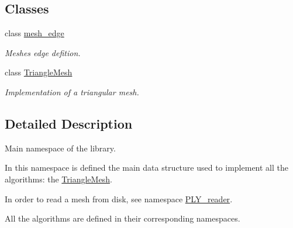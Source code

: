 \subsection*{Classes}
\begin{DoxyCompactItemize}
\item 
class \hyperlink{classgeoproc_1_1mesh__edge}{mesh\+\_\+edge}
\begin{DoxyCompactList}\small\item\em Meshe\textquotesingle{}s edge defition. \end{DoxyCompactList}\item 
class \hyperlink{classgeoproc_1_1TriangleMesh}{Triangle\+Mesh}
\begin{DoxyCompactList}\small\item\em Implementation of a triangular mesh. \end{DoxyCompactList}\end{DoxyCompactItemize}


\subsection{Detailed Description}
Main namespace of the library. 

In this namespace is defined the main data structure used to implement all the algorithms\+: the \hyperlink{classgeoproc_1_1TriangleMesh}{Triangle\+Mesh}.

In order to read a mesh from disk, see namespace \hyperlink{namespacegeoproc_1_1PLY__reader}{P\+L\+Y\+\_\+reader}.

All the algorithms are defined in their corresponding namespaces. 